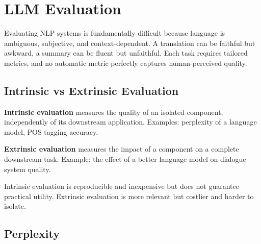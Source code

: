 \chapter{LLM Evaluation}
\label{ch:evaluation}

\begin{intuition}[title=\textbf{Why evaluation is hard}]
Evaluating NLP systems is fundamentally difficult because language is
ambiguous, subjective, and context-dependent. A translation can be
faithful but awkward, a summary can be fluent but unfaithful. Each task
requires tailored metrics, and no automatic metric perfectly captures
human-perceived quality.
\end{intuition}

\section{Intrinsic vs Extrinsic Evaluation}
\label{sec:eval:types}

\begin{definition}
\textbf{Intrinsic evaluation} measures the quality of an isolated
component, independently of its downstream application. Examples:
perplexity of a language model, POS tagging accuracy.
\end{definition}

\begin{definition}
\textbf{Extrinsic evaluation} measures the impact of a component on a
complete downstream task. Example: the effect of a better language model
on dialogue system quality.
\end{definition}

\begin{remark}
Intrinsic evaluation is reproducible and inexpensive but does not
guarantee practical utility. Extrinsic evaluation is more relevant but
costlier and harder to isolate.
\end{remark}

\section{Perplexity}
\label{sec:eval:perplexity}

